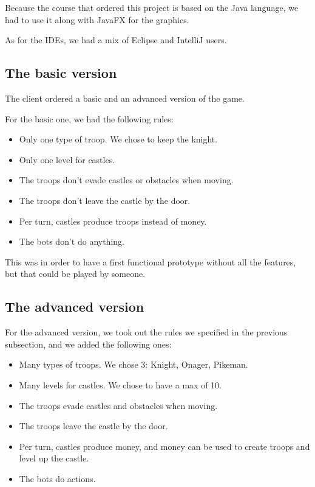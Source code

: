 \documentclass[12pt, a4paper]{report}
\begin{document}
Because the course that ordered this project is based on the Java language, we had to use it along with JavaFX for the graphics.

As for the IDEs, we had a mix of Eclipse and IntelliJ users.

\subsection*{The basic version}

The client ordered a basic and an advanced version of the game.

For the basic one, we had the following rules:

\begin{itemize}
    \item Only one type of troop. We chose to keep the knight.
    \item Only one level for castles.
    \item The troops don't evade castles or obstacles when moving.
    \item The troops don't leave the castle by the door.
    \item Per turn, castles produce troops instead of money.
    \item The bots don't do anything.
\end{itemize}

This was in order to have a first functional prototype without all the features, but that could be played by someone.

\subsection*{The advanced version}

For the advanced version, we took out the rules we specified in the previous subsection, and we added the following ones:

\begin{itemize}
    \item Many types of troops. We chose 3: Knight, Onager, Pikeman.
    \item Many levels for castles. We chose to have a max of 10.
    \item The troops evade castles and obstacles when moving.
    \item The troops leave the castle by the door.
    \item Per turn, castles produce money, and money can be used to create troops and level up the castle.
    \item The bots do actions.
\end{itemize}
\end{document}
